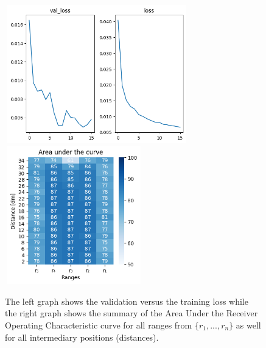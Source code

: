 \begin{multicols}{2}
\begin{itemize}
\end{itemize}
\end{multicols}\begin{figure}[H]%
\centering
\includegraphics[width=8cm,height=6cm]{3_models/models_61/graph_61.png}
\hspace{0.2 cm}
\includegraphics[width=6cm,height=6cm]{4_plots/plots_61/AUC_61.png}
\caption{The left graph shows the validation versus the training loss while the right graph shows the summary of the Area Under the Receiver Operating Characteristic curve for all ranges from $\{r_{1}, ... ,r_{n}\}$ as well for all intermediary positions (distances).}
\label{auc_61}
\end{figure}


\newpage

